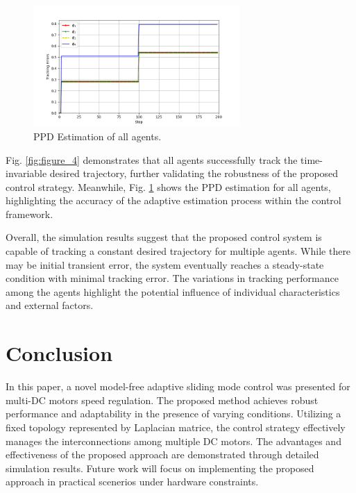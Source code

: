 \documentclass[journal,onecolumn]{IEEEtran}
\begin{document}
\begin{figure}[H]
    \centering
    \includegraphics[width=0.7\textwidth]{Figure_5.png}
    \caption{PPD Estimation of all agents.}
    \label{fig:figure_5} %
\end{figure}

Fig. \ref{fig:figure_4} demonstrates that all agents successfully track the time-invariable desired trajectory, further validating the robustness of the proposed control strategy. Meanwhile, Fig. \ref{fig:figure_5} shows the PPD estimation for all agents, highlighting the accuracy of the adaptive estimation process within the control framework.

Overall, the simulation results suggest that the proposed control system is capable of tracking a constant desired trajectory for multiple agents. While there may be initial transient error, the system eventually reaches a steady-state condition with minimal tracking error. The variations in tracking performance among the agents highlight the potential influence of individual characteristics and external factors.

\section{Conclusion}

In this paper, a novel model-free adaptive sliding mode control was presented for multi-DC motors speed regulation. The proposed method achieves robust performance and adaptability in the presence of varying conditions. Utilizing a fixed topology represented by Laplacian matrice, the control strategy effectively manages the interconnections among multiple DC motors. The advantages and effectiveness of the proposed approach are demonstrated through detailed simulation results. Future work will focus on implementing the proposed approach in practical scenerios under hardware constraints.
\end{document}
